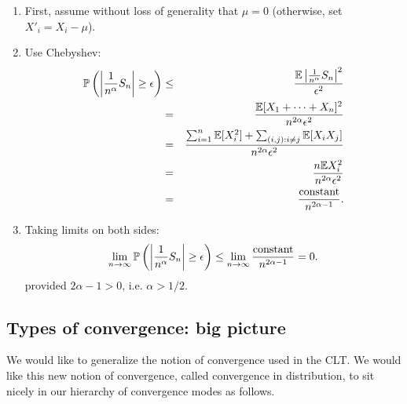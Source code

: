 \documentclass{article}
\begin{document}
  \begin{enumerate}
	\item First, assume without loss of generality that $\mu = 0$ (otherwise, set $X'_i = X_i - \mu$). 
	\item Use Chebyshev:
	\begin{eqnarray*}
		\P\left(\left|\frac{1}{n^\alpha}S_n\right| \ge \epsilon \right) &\le& \frac{\E\left| \frac{1}{n^\alpha} S_n \right|^2}{\epsilon^2} \\
		&=& \frac{\E[X_1 + \dots + X_n]^2}{n^{2\alpha} \epsilon^2} \\
		&=& \frac{\sum_{i=1}^n \E[X_i^2] + \sum_{(i,j):i\neq j} \E[X_i X_j]}{n^{2\alpha} \epsilon^2} \\
		&=& \frac{n \E X_i^2}{n^{2\alpha} \epsilon^2} \\
		&=& \frac{\text{constant}}{n^{2\alpha - 1}}.
	\end{eqnarray*}
	\item Taking limits on both sides: \[ \lim_{n\to\infty} \P\left(\left|\frac{1}{n^\alpha}S_n\right| \ge \epsilon \right) \le \lim_{n\to\infty} \frac{\text{constant}}{n^{2\alpha - 1}} = 0. \]
	provided $2\alpha - 1 > 0$, i.e. $\alpha > 1/2$.
\end{enumerate}



\subsection{Types of convergence: big picture}\label{sec:conv-types-big-picture}

We would like to generalize the notion of convergence used in the CLT. We would like this new notion of convergence, called convergence in distribution, to sit nicely in our hierarchy of convergence modes as follows. 
\end{document}
